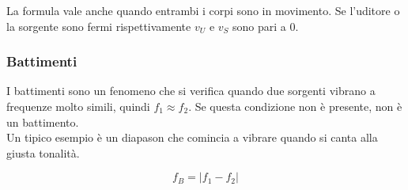 La formula vale anche quando entrambi i corpi sono in movimento. Se l'uditore o la sorgente sono fermi
rispettivamente $v_U$ e $v_S$ sono pari a $0$.

\subsubsection{Battimenti}
I battimenti sono un fenomeno che si verifica quando due sorgenti vibrano a frequenze molto simili,
quindi $f_1 \approx f_2$. Se questa condizione non è presente, non è un battimento.\\
Un tipico esempio è un diapason che comincia a vibrare quando si canta alla giusta tonalità.

\begin{equation*}
f_B = \left\vert f_1 - f_2 \right\vert
\end{equation*}
